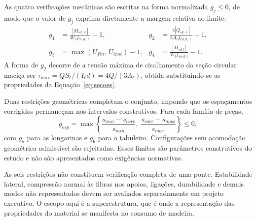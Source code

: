 As quatro verificações mecânicas são escritas na forma normalizada $g_j\leq0$, de modo que o valor de $g_j$ exprima diretamente a margem relativa ao limite:
\begin{align}
g_1&=\frac{|M_{sd,\ell}|}{W_\ell f_{m,d,\ell}}-1,&
g_2&=\frac{4|Q_{sd,\ell}|}{3A_\ell f_{v0,d,\ell}}-1,\label{eq:g12}\\
g_3&=\max\left(U_{fin},\,U_{inst}\right)-1,&
g_4&=\frac{|M_{sd,t}|}{W_t f_{m,d,t}}-1.
\label{eq:g34}
\end{align}
A forma de $g_2$ decorre de a tensão máxima de cisalhamento da seção circular maciça ser $\tau_{\max}=Q S_\ell/(I_\ell d)=4Q/(3A_\ell)$, obtida substituindo-se as propriedades da Equação~\eqref{eq:secoes}.

Duas restrições geométricas completam o conjunto, impondo que os espaçamentos corrigidos permaneçam nos intervalos construtivos. Para cada família de peças,
\begin{equation}
g_{esp}=\max\left\{\frac{s_{min}-s_{corr}}{s_{min}},\;\frac{s_{corr}-s_{max}}{s_{max}}\right\}\leq0,
\label{eq:restricao_espaco}
\end{equation}
com $g_5$ para as longarinas e $g_6$ para o tabuleiro. Configurações sem acomodação geométrica admissível são rejeitadas. Esses limites são parâmetros construtivos do estudo e não são apresentados como exigências normativas.

As seis restrições não constituem verificação completa de uma ponte. Estabilidade lateral, compressão normal às fibras nos apoios, ligações, durabilidade e demais modos não representados devem ser avaliados separadamente em projeto executivo. O escopo aqui é a superestrutura, que é onde a representação das propriedades do material se manifesta no consumo de madeira.
